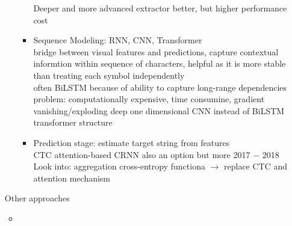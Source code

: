 \begin{itemize}
\begin{itemize}
\begin{itemize}
                        Deeper and more advanced extractor better, but higher performance cost
                    \item Sequence Modeling: RNN, CNN, Transformer \\
                        bridge between visual features and predictions, capture contextual informtion
                        within sequence of characters, helpful as it is more stable than treating each
                        symbol independently\\
                        often BiLSTM because of ability to capture long-range dependencies
                        problem: computationally expensive, time consumine, gradient vanishing/exploding
                        deep one dimensional CNN instead of BiLSTM\\
                        transformer structure
                    \item Prediction stage: estimate target string from features\\
                        CTC
                        attention-based
                        CRNN also an option but more 2017 $-$ 2018
                        Look into: aggregation cross-entropy functiona
                            $\rightarrow$ replace CTC and attention mechanism
                \end{itemize}
        \end{itemize}
        Other approaches
        \begin{itemize}
            \item
        \end{itemize}
\end{itemize}

